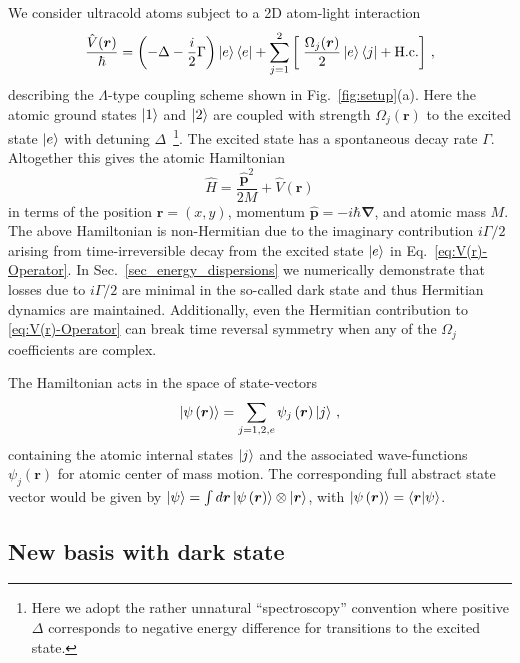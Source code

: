 \documentclass[aps,pra,twocolumn,showpacs,superscriptaddress,floatfix,longbibliography]{revtex4-1}
\begin{document}
We consider ultracold atoms subject to a 2D atom-light interaction 
\begin{equation}
\frac{\hat{V}(\boldsymbol{r})}{\hbar}=\left(-\Delta-\frac{i}{2}\Gamma\right)\ket e\bra e+\sum_{j=1}^{2}\left[\;  \frac{\Omega_{j}(\boldsymbol{r})}{2}\ket e\bra j+ {\rm H.c.} \right]\,,\label{eq:V(r)-Operator}
\end{equation}
describing the $\Lambda$-type coupling scheme \cite{Dum1996,Juzeliunas2005,Goldman2014} shown in Fig.~\ref{fig:setup}(a).
Here the atomic ground states $\ket 1$ and $\ket 2$ are coupled with strength $\Omega_{j}(\boldsymbol{r})$ to the excited state $\ket e$ with detuning $\Delta$~\footnote{Here we adopt the rather unnatural ``spectroscopy'' convention where positive $\Delta$ corresponds to negative energy difference for transitions to the excited state.}.
The excited state has a spontaneous decay rate $\Gamma$.
Altogether this gives the atomic Hamiltonian
\begin{equation}
\hat{H}=\frac{\hat{\mathbf{p}}^{2}}{2M}+\hat{V}(\boldsymbol{r}) \label{eq:H}
\end{equation}
in terms of the position $\boldsymbol{r} = (x,y)$, momentum $\hat{\mathbf{p}} = - i \hbar \boldsymbol{\nabla}$, and atomic mass $M$.
The above Hamiltonian is non-Hermitian due to the imaginary contribution $i \Gamma / 2$ arising from time-irreversible decay from the excited state $\ket{e}$ in Eq.~\eqref{eq:V(r)-Operator}.   
In Sec.~\ref{sec_energy_dispersions} we numerically demonstrate that losses due to $i \Gamma / 2$ are minimal in the so-called dark state and thus Hermitian dynamics are maintained. Additionally, even the Hermitian contribution to \eqref{eq:V(r)-Operator} can break time reversal symmetry when any of the $\Omega_j$ coefficients are complex.

The Hamiltonian acts in the space of state-vectors
\begin{equation}
\ket{\psi\left(\boldsymbol{r}\right)} = \sum_{j=1,2,e} \psi_{j}\left(\boldsymbol{r}\right) \ket{j} \, , \label{eq:|psi>-expansion}
\end{equation}
containing the atomic internal states $\ket{j}$ and the associated wave-functions $\psi_{j}\left(\boldsymbol{r}\right)$ for atomic center of mass motion.
The corresponding full abstract state vector would be given by $\ket{\psi} = \int d \boldsymbol{r} \ket{\psi\left(\boldsymbol{r}\right)} \otimes \ket{\boldsymbol{r}} $, with $\ket{\psi\left(\boldsymbol{r}\right)} = \braket{\boldsymbol{r}}{\psi}$.

\subsection{New basis with dark state}
\end{document}
